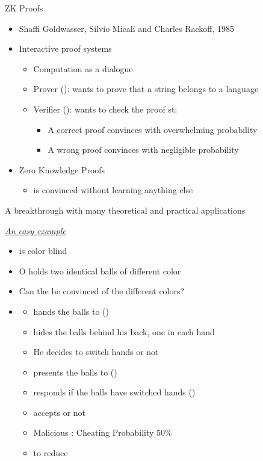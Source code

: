 \documentclass[handout]{beamer}
\begin{document}
\begin{frame}{ZK Proofs}
\begin{itemize}
\item Shaffi Goldwasser, Silvio Micali and Charles Rackoff, 1985
\pause
\item Interactive proof systems
\pause
\begin{itemize}
\item Computation as a dialogue
\pause
\item Prover (\prv): wants to prove that a string belongs to a language
\pause
\item Verifier (\ver): wants to check the proof st: 
\pause
\begin{itemize}
\item A correct proof convinces \ver with overwhelming probability
\item A wrong proof convinces \ver with negligible probability
\end{itemize}
\end{itemize}
\item Zero Knowledge Proofs
\begin{itemize}
\item \ver is convinced without learning anything else
\end{itemize}
\pause
\end{itemize}
A breakthrough with many theoretical and practical applications
\end{frame}

\begin{frame}{\textit{\href{http://mathoverflow.net/questions/22624/example-of-a-good-zero-knowledge-proof}{An easy example}}}
\begin{itemize}
\item \ver is color blind
\pause
\item O \prv holds two identical balls of different color
\pause
\item Can the \ver be convinced of the different colors? 
\pause
\item {}
\begin{itemize}
\item \prv hands the balls to \ver ()
\item \ver hides the balls behind his back, one in each hand
\pause
\item He  decides to switch hands or not
\pause
\item \ver presents the balls to \prv ()
\pause
\item \prv responds if the balls have switched hands ()
\pause
\item \ver accepts or not
\pause
\item Malicious \prv: Cheating Probability $50\%$
\pause
\item {} to reduce
\end{itemize}
\end{itemize}
\end{frame}
\end{document}
